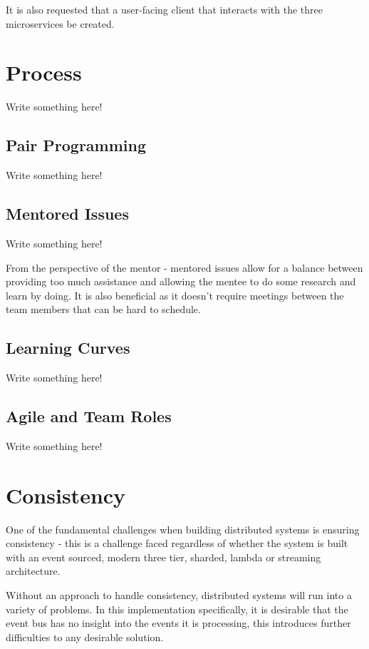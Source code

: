 \documentclass{l3proj}
\begin{document}
It is also requested that a user-facing client that interacts with the three microservices be created.

\section{Process}
\label{sec:process}
Write something here!

\subsection{Pair Programming}
Write something here!

\subsection{Mentored Issues}
Write something here!

From the perspective of the mentor - mentored issues allow for a balance between providing too much assistance and allowing the mentee to do some research and learn by doing. It is also beneficial as it doesn't require meetings between the team members that can be hard to schedule.

\subsection{Learning Curves}
Write something here!

\subsection{Agile and Team Roles}
Write something here!

\section{Consistency}
\label{sec:consistency}

One of the fundamental challenges when building distributed systems is ensuring consistency - this is a challenge faced regardless of whether the system is built with an event sourced, modern three tier, sharded, lambda or streaming architecture.

Without an approach to handle consistency, distributed systems will run into a variety of problems. In this implementation specifically, it is desirable that the event bus has no insight into the events it is processing, this introduces further difficulties to any desirable solution.
\end{document}
